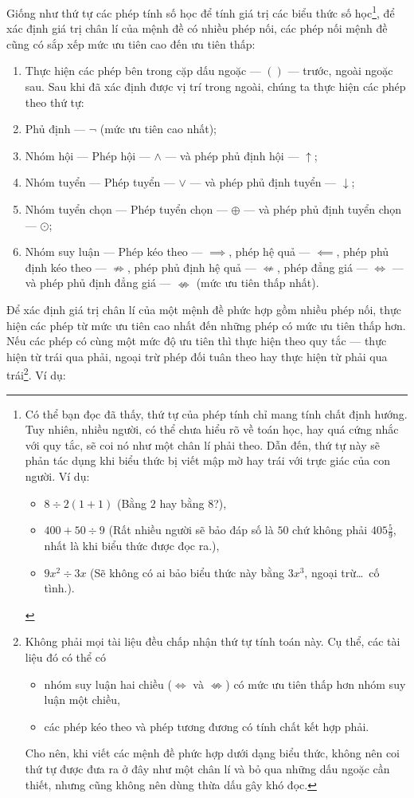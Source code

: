 Giống như thứ tự các phép tính số học để tính giá trị các biểu thức số học\footnote{Có thể bạn đọc đã thấy, thứ tự của phép tính chỉ mang tính chất định hướng. Tuy nhiên, nhiều người, có thể chưa hiểu rõ về toán học, hay quá cứng nhắc với quy tắc, sẽ coi nó như một chân lí phải theo. Dẫn đến, thứ tự này sẽ phản tác dụng khi biểu thức bị viết mập mờ hay trái với trực giác của con người. Ví dụ:
\begin{itemize}
   \item $8 \div 2(1+1)$ (Bằng $2$ hay bằng $8$?),
   \item $400 + 50 \div 9$ (Rất nhiều người sẽ bảo đáp số là $50$ chứ không phải $405\frac{5}{9}$, nhất là khi biểu thức được đọc ra.),
   \item $9x^2 \div 3x$ (Sẽ không có ai bảo biểu thức này bằng $3x^3$, ngoại trừ\dots\ cố tình.).
\end{itemize}
}, để xác định giá trị chân lí của mệnh đề có nhiều phép nối, các phép nối mệnh đề cũng có sắp xếp mức ưu tiên cao đến ưu tiên thấp:
\begin{enumerate}[start=0]
   \item Thực hiện các phép bên trong cặp dấu ngoặc --- $()$ --- trước, ngoài ngoặc sau. Sau khi đã xác định được vị trí trong ngoài, chúng ta thực hiện các phép theo thứ tự:
   \item Phủ định --- $\neg$ (mức ưu tiên cao nhất);
   \item Nhóm hội --- Phép hội --- $\land$ --- và phép phủ định hội --- $\uparrow$;
   \item Nhóm tuyển --- Phép tuyển --- $\lor$ --- và phép phủ định tuyển --- $\downarrow$;
   \item Nhóm tuyển chọn --- Phép tuyển chọn --- $\oplus$ --- và phép phủ định tuyển chọn --- $\odot$;
   \item Nhóm suy luận --- Phép kéo theo --- $\implies$, phép hệ quả --- $\impliedby$, phép phủ định kéo theo --- $\nRightarrow$, phép phủ định hệ quả --- $\nLeftarrow$, phép đẳng giá --- $\iff$ --- và phép phủ định đẳng giá --- $\nLeftrightarrow$ (mức ưu tiên thấp nhất).
\end{enumerate}
Để xác định giá trị chân lí của một mệnh đề phức hợp gồm nhiều phép nối, thực hiện các phép từ mức ưu tiên cao nhất đến những phép có mức ưu tiên thấp hơn. Nếu các phép có cùng một mức độ ưu tiên thì thực hiện theo quy tắc  --- thực hiện từ trái qua phải, ngoại trừ phép đối tuân theo  hay thực hiện từ phải qua trái\footnote{Không phải mọi tài liệu đều chấp nhận thứ tự tính toán này. Cụ thể, các tài liệu đó có thể có
\begin{itemize}
   \item nhóm suy luận hai chiều ($\iff$ và $\nLeftrightarrow$) có mức ưu tiên thấp hơn nhóm suy luận một chiều,
   \item các phép kéo theo và phép tương đương có tính chất kết hợp phải.
\end{itemize} Cho nên, khi viết các mệnh đề phức hợp dưới dạng biểu thức, không nên coi thứ tự được đưa ra ở đây như một chân lí và bỏ qua những dấu ngoặc cần thiết, nhưng cũng không nên dùng thừa dấu gây khó đọc.}. Ví dụ:

